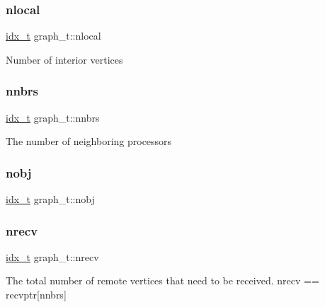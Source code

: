 \mbox{\label{a00734_aed6577a7e086dbb0bf48a80f3a6ede05}} 
\subsubsection{\texorpdfstring{nlocal}{nlocal}}
{\footnotesize\ttfamily \hyperlink{a00876_aaa5262be3e700770163401acb0150f52}{idx\+\_\+t} graph\+\_\+t\+::nlocal}

Number of interior vertices \mbox{\label{a00734_ab56276f68a72adf019bd226323060173}} 
\subsubsection{\texorpdfstring{nnbrs}{nnbrs}}
{\footnotesize\ttfamily \hyperlink{a00876_aaa5262be3e700770163401acb0150f52}{idx\+\_\+t} graph\+\_\+t\+::nnbrs}

The number of neighboring processors \mbox{\label{a00734_a37741878bacd95f3f9f19a3cdf9fc9b2}} 
\subsubsection{\texorpdfstring{nobj}{nobj}}
{\footnotesize\ttfamily \hyperlink{a00876_aaa5262be3e700770163401acb0150f52}{idx\+\_\+t} graph\+\_\+t\+::nobj}

\mbox{\label{a00734_af1a64fbb05c262288de7b2a156c60b5b}} 
\subsubsection{\texorpdfstring{nrecv}{nrecv}}
{\footnotesize\ttfamily \hyperlink{a00876_aaa5262be3e700770163401acb0150f52}{idx\+\_\+t} graph\+\_\+t\+::nrecv}

The total number of remote vertices that need to be received. nrecv == recvptr\mbox{[}nnbrs\mbox{]} \mbox{\label{a00734_a2dc2c0036164197618f711c93b0d74e9}} 
